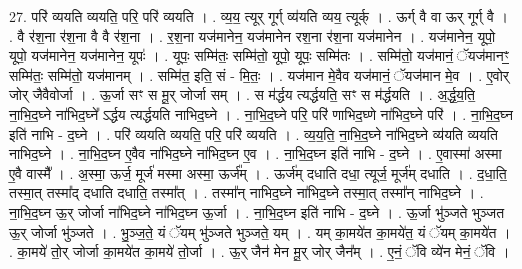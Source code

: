 \documentclass[17pt]{extarticle}
\begin{document}
27. परि॑ व्ययति व्ययति॒ परि॒ परि॑ व्ययति । . व्य॒य॒ त्यूर् गूर्ग् व्य॑यति व्यय॒ त्यूर्क् । . ऊर्ग् वै वा ऊर् गूर्ग् वै । . वै र॑श॒ना र॑श॒ना वै वै र॑श॒ना । . र॒श॒ना यज॑मानेन॒ यज॑मानेन रश॒ना र॑श॒ना यज॑मानेन । . यज॑मानेन॒ यूपो॒ यूपो॒ यज॑मानेन॒ यज॑मानेन॒ यूपः॑ । . यूपः॒ सम्मि॑तः॒ सम्मि॑तो॒ यूपो॒ यूपः॒ सम्मि॑तः । . सम्मि॑तो॒ यज॑मानं॒ ॅयज॑मानꣳ॒॒ सम्मि॑तः॒ सम्मि॑तो॒ यज॑मानम् । . सम्मि॑त॒ इति॒ सं - मि॒तः॒ । . यज॑मान मे॒वैव यज॑मानं॒ ॅयज॑मान मे॒व । . ए॒वोर् जोर् जैवैवोर्जा । . ऊ॒र्जा सꣳ स मू॒र् जोर्जा सम् । . स म॑र्द्धय त्यर्द्धयति॒ सꣳ स म॑र्द्धयति । . अ॒र्द्ध॒य॒ति॒ ना॒भि॒द॒घ्ने ना॑भिद॒घ्ने᳚ ऽर्द्धय त्यर्द्धयति नाभिद॒घ्ने । . ना॒भि॒द॒घ्ने परि॒ परि॑ णाभिद॒घ्णे ना॑भिद॒घ्ने परि॑ । . ना॒भि॒द॒घ्न इति॑ नाभि - द॒घ्ने । . परि॑ व्ययति व्ययति॒ परि॒ परि॑ व्ययति । . व्य॒य॒ति॒ ना॒भि॒द॒घ्ने ना॑भिद॒घ्ने व्य॑यति व्ययति नाभिद॒घ्ने । . ना॒भि॒द॒घ्न ए॒वैव ना॑भिद॒घ्ने ना॑भिद॒घ्न ए॒व । . ना॒भि॒द॒घ्न इति॑ नाभि - द॒घ्ने । . ए॒वास्मा॑ अस्मा ए॒वै वास्मै᳚ । . अ॒स्मा॒ ऊर्ज॒ मूर्ज॑ मस्मा अस्मा॒ ऊर्ज᳚म् । . ऊर्ज॑म् दधाति दधा॒ त्यूर्ज॒ मूर्ज॑म् दधाति । . द॒धा॒ति॒ तस्मा॒त् तस्मा᳚द् दधाति दधाति॒ तस्मा᳚त् । . तस्मा᳚न् नाभिद॒घ्ने ना॑भिद॒घ्ने तस्मा॒त् तस्मा᳚न् नाभिद॒घ्ने । . ना॒भि॒द॒घ्न ऊ॒र् जोर्जा ना॑भिद॒घ्ने ना॑भिद॒घ्न ऊ॒र्जा । . ना॒भि॒द॒घ्न इति॑ नाभि - द॒घ्ने । . ऊ॒र्जा भु॑ञ्जते भुञ्जत ऊ॒र् जोर्जा भु॑ञ्जते । . भु॒ञ्ज॒ते॒ यं ॅयम् भु॑ञ्जते भुञ्जते॒ यम् । . यम् का॒मये॑त का॒मये॑त॒ यं ॅयम् का॒मये॑त । . का॒मये॑ तो॒र् जोर्जा का॒मये॑त का॒मये॑ तो॒र्जा । . ऊ॒र् जैन॑ मेन मू॒र् जोर् जैन᳚म् । . ए॒नं॒ ॅवि व्ये॑न मेनं॒ ॅवि । \newline
\end{document}
